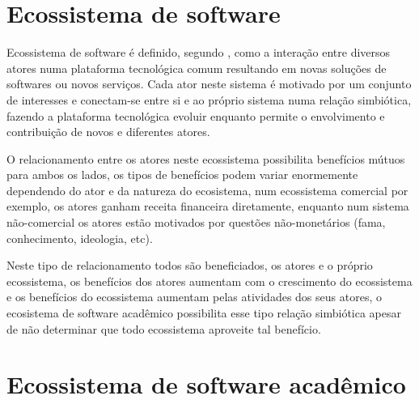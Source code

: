 \section{Ecossistema de software}


Ecossistema de software é definido, segundo ,
como a interação entre diversos atores numa plataforma tecnológica comum
resultando em novas soluções de softwares ou novos serviços. Cada ator neste
sistema é motivado por um conjunto de interesses e conectam-se entre si e ao
próprio sistema numa relação simbiótica, fazendo a plataforma tecnológica
evoluir enquanto permite o envolvimento e contribuição de novos e diferentes
atores.

O relacionamento entre os atores neste ecossistema possibilita benefícios
mútuos para ambos os lados, os tipos de benefícios podem variar enormemente
dependendo do ator e da natureza do ecosistema, num ecossistema comercial por
exemplo, os atores ganham receita financeira diretamente, enquanto num sistema
não-comercial os atores estão motivados por questões não-monetários (fama,
conhecimento, ideologia, etc).

Neste tipo de relacionamento todos são beneficiados, os atores e o próprio
ecossistema, os benefícios dos atores aumentam com o crescimento do ecossistema
e os benefícios do ecossistema aumentam pelas atividades dos seus atores, o
ecosistema de software acadêmico possibilita esse tipo relação simbiótica
apesar de não determinar que todo ecossistema aproveite tal benefício.

%
%

\section{Ecossistema de software acadêmico}


